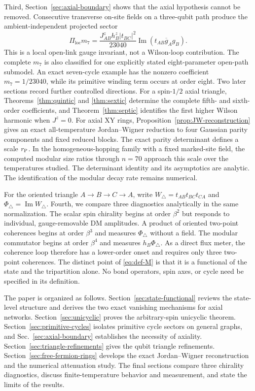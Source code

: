 \documentclass[11pt]{article}
\newcommand{\Wtri}{W_\triangle}
\newcommand{\PhiTri}{\Phi_\triangle}
\begin{document}
Third, Section~\ref{sec:axial-boundary} shows that the axial hypothesis cannot
be removed.  Consecutive transverse on-site fields on a three-qubit path
produce the ambient-independent projected sector
\begin{equation}
 \Pi_{\mathrm{loc}}m_7
 =\frac{J_{AB}^zh_B^z|t_{BC}|^2}{23040}
 \operatorname{Im}(t_{AB}\overline g_Ag_B).
 \label{eq:intro-local-background}
\end{equation}
This is a local open-link gauge invariant, not a Wilson-loop contribution.
The complete $m_7$ is also classified for one explicitly stated
eight-parameter open-path submodel.  An exact seven-cycle example has the
nonzero coefficient $m_7=1/23040$, while its primitive winding term occurs at
order eight.  Two later sections record further controlled directions.  For
a spin-$1/2$ axial triangle, Theorems~\ref{thm:quintic} and
\ref{thm:sextic} determine the complete fifth- and sixth-order coefficients,
and Theorem~\ref{thm:septic} identifies the first higher Wilson harmonic when
$J^z=0$.  For axial XY rings, Proposition~\ref{prop:JW-reconstruction} gives
an exact all-temperature Jordan--Wigner reduction to four Gaussian parity
components and fixed reduced blocks.  The exact parity determinant defines a
scale $r_{\rm P}$.  In the homogeneous-hopping family with a fixed marked-site
field, the computed modular size ratios through $n=70$ approach this scale
over the temperatures studied.  The
determinant identity and its asymptotics are analytic.  The identification of
the modular decay rate remains numerical.

For the oriented triangle $A\to B\to C\to A$, write
$\Wtri=t_{AB}t_{BC}t_{CA}$ and $\PhiTri=\operatorname{Im}\Wtri$.
Fourth, we compare three diagnostics analytically in
the same normalization.
The scalar spin chirality begins at order $\beta^2$ but responds to individual,
gauge-removable DM amplitudes.  A product of oriented two-point coherences
begins at order $\beta^3$ and measures $\PhiTri$ without a field.  The modular
commutator begins at order $\beta^4$ and measures $h_B\PhiTri$.  As a direct
flux meter, the coherence loop therefore has a lower-order onset and requires
only three two-point coherences.
The distinct point of \eqref{eq:def-M} is that it is a functional of the state
and the tripartition alone.  No bond operators, spin axes, or cycle need be
specified in its definition.

The paper is organized as follows.  Section~\ref{sec:state-functional}
reviews the state-level structure and derives the two exact vanishing
mechanisms for axial networks.  Section~\ref{sec:unicyclic} proves the
arbitrary-spin unicyclic theorem.  Section~\ref{sec:primitive-cycles}
isolates primitive cycle sectors on general graphs, and
Sec.~\ref{sec:axial-boundary} establishes the necessity of axiality.
Section~\ref{sec:triangle-refinements} gives the qubit triangle refinements.
Section~\ref{sec:free-fermion-rings} develops the exact Jordan--Wigner
reconstruction and the numerical attenuation study.  The final sections
compare three chirality diagnostics, discuss finite-temperature behavior and
measurement, and state the limits of the results.
\end{document}
